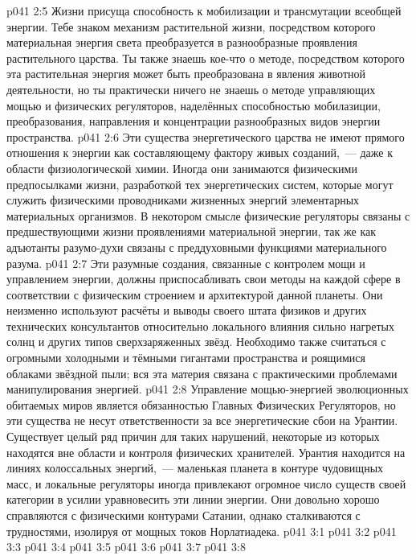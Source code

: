 \vs p041 2:5 Жизни присуща способность к мобилизации и трансмутации всеобщей энергии. Тебе знаком механизм растительной жизни, посредством которого материальная энергия света преобразуется в разнообразные проявления растительного царства. Ты также знаешь кое-что о методе, посредством которого эта растительная энергия может быть преобразована в явления животной деятельности, но ты практически ничего не знаешь о методе управляющих мощью и физических регуляторов, наделённых способностью мобилазиции, преобразования, направления и концентрации разнообразных видов энергии пространства.
\vs p041 2:6 \pc Эти существа энергетического царства не имеют прямого отношения к энергии как составляющему фактору живых созданий,~--- даже к области физиологической химии. Иногда они занимаются физическими предпосылками жизни, разработкой тех энергетических систем, которые могут служить физическими проводниками жизненных энергий элементарных материальных организмов. В некотором смысле физические регуляторы связаны с предшествующими жизни проявлениями материальной энергии, так же как адъютанты разумо\hyp{}духи связаны с преддуховными функциями материального разума.
\vs p041 2:7 \pc Эти разумные создания, связанные с контролем мощи и управлением энергии, должны приспосабливать свои методы на каждой сфере в соответствии с физическим строением и архитектурой данной планеты. Они неизменно используют расчёты и выводы своего штата физиков и других технических консультантов относительно локального влияния сильно нагретых солнц и других типов сверхзаряженных звёзд. Необходимо также считаться с огромными холодными и тёмными гигантами пространства и роящимися облаками звёздной пыли; вся эта материя связана с практическими проблемами манипулирования энергией.
\vs p041 2:8 Управление мощью\hyp{}энергией эволюционных обитаемых миров является обязанностью Главных Физических Регуляторов, но эти существа не несут ответственности за все энергетические сбои на Урантии. Существует целый ряд причин для таких нарушений, некоторые из которых находятся вне области и контроля физических хранителей. Урантия находится на линиях колоссальных энергий,~--- маленькая планета в контуре чудовищных масс, и локальные регуляторы иногда привлекают огромное число существ своей категории в усилии уравновесить эти линии энергии. Они довольно хорошо справляются с физическими контурами Сатании, однако сталкиваются с трудностями, изолируя от мощных токов Норлатиадека.
\vs p041 3:1 
\vs p041 3:2 
\vs p041 3:3 \pc 
\vs p041 3:4 
\vs p041 3:5 \pc 
\vs p041 3:6 \pc 
\vs p041 3:7 
\vs p041 3:8 \pc 
